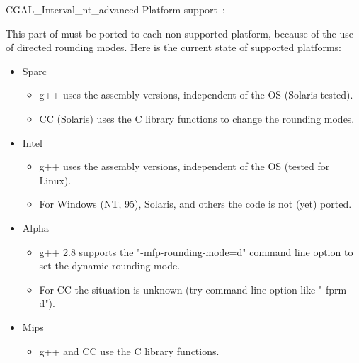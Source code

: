 \begin{ccAdvanced}
\begin{ccClass} {CGAL_Interval_nt_advanced}
Platform support~:

This part of {\cgal} must be ported to each non-supported platform, because
of the use of directed rounding modes.  
Here is the current state of supported platforms:

\begin{itemize}
\item Sparc
\begin{itemize}
\item g++ uses the assembly versions, independent of the OS (Solaris tested).
\item CC (Solaris) uses the C library functions to change the rounding modes.
\end{itemize}
\item Intel
\begin{itemize}
\item g++ uses the assembly versions, independent of the OS (tested for Linux).
\item For Windows (NT, 95), Solaris, and others the code is not (yet) ported.
\end{itemize}
\item Alpha
\begin{itemize}
\item g++ 2.8 supports the "-mfp-rounding-mode=d" command line option
      to set the dynamic rounding mode.
\item For CC the situation is unknown (try command line option like "-fprm d").
\end{itemize}
\item Mips
\begin{itemize}
\item g++ and CC use the C library functions.
\end{itemize}
\end{itemize}






\end{ccClass}

\end{ccAdvanced}
